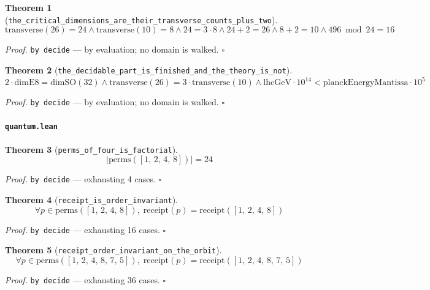\documentclass[11pt]{article}
\newtheorem{theorem}{Theorem}[section]
\begin{document}
\begin{theorem}[\texttt{the\_critical\_dimensions\_are\_their\_transverse\_counts\_plus\_two}]
\[ \mathrm{transverse}\mathopen{}\left(26\right) = 24 \land \mathrm{transverse}\mathopen{}\left(10\right) = 8 \land 24 = 3 \cdot 8 \land 24 + 2 = 26 \land 8 + 2 = 10 \land 496 \bmod 24 = 16 \]
\end{theorem}
\noindent\emph{Proof.} \texttt{by decide} --- by evaluation; no domain is walked. \hfill$\square$

\begin{theorem}[\texttt{the\_decidable\_part\_is\_finished\_and\_the\_theory\_is\_not}]
\[ 2 \cdot \mathrm{dimE8} = \mathrm{dimSO}\mathopen{}\left(32\right) \land \mathrm{transverse}\mathopen{}\left(26\right) = 3 \cdot \mathrm{transverse}\mathopen{}\left(10\right) \land \mathrm{lhcGeV} \cdot 10^{14} < \mathrm{planckEnergyMantissa} \cdot 10^{5} \]
\end{theorem}
\noindent\emph{Proof.} \texttt{by decide} --- by evaluation; no domain is walked. \hfill$\square$

\paragraph{\texttt{quantum.lean}}

\begin{theorem}[\texttt{perms\_of\_four\_is\_factorial}]
\[ \left|\mathrm{perms}\mathopen{}\left([1,\,2,\,4,\,8]\right)\right| = 24 \]
\end{theorem}
\noindent\emph{Proof.} \texttt{by decide} --- exhausting 4 cases. \hfill$\square$

\begin{theorem}[\texttt{receipt\_is\_order\_invariant}]
\[ \forall p \in \mathrm{perms}\mathopen{}\left([1,\,2,\,4,\,8]\right),\; \mathrm{receipt}\mathopen{}\left(p\right) = \mathrm{receipt}\mathopen{}\left([1,\,2,\,4,\,8]\right) \]
\end{theorem}
\noindent\emph{Proof.} \texttt{by decide} --- exhausting 16 cases. \hfill$\square$

\begin{theorem}[\texttt{receipt\_order\_invariant\_on\_the\_orbit}]
\[ \forall p \in \mathrm{perms}\mathopen{}\left([1,\,2,\,4,\,8,\,7,\,5]\right),\; \mathrm{receipt}\mathopen{}\left(p\right) = \mathrm{receipt}\mathopen{}\left([1,\,2,\,4,\,8,\,7,\,5]\right) \]
\end{theorem}
\noindent\emph{Proof.} \texttt{by decide} --- exhausting 36 cases. \hfill$\square$
\end{document}

